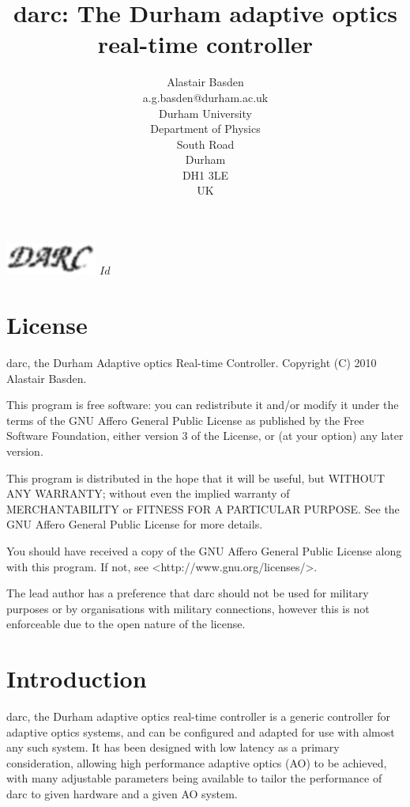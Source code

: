 \documentclass[a4,10pt]{article}
\title{darc: The Durham adaptive optics real-time controller}
\author{Alastair Basden \\ a.g.basden@durham.ac.uk \\ Durham University \\ Department of Physics
  \\ South Road \\ Durham \\ DH1 3LE \\ UK}
\providecommand{\gitID}{$Id$}
\newcommand{\ao}{adaptive optics (AO)\renewcommand{\ao}{AO\xspace}\xspace}
\begin{document}
\maketitle
{\hspace{7cm} \includegraphics[width=3cm]{darclogo.eps}}
\vfill
\gitID
%

\pagebreak
\tableofcontents
\pagebreak
\section{License}
darc, the Durham Adaptive optics Real-time Controller.
Copyright (C) 2010 Alastair Basden.

This program is free software: you can redistribute it and/or modify
it under the terms of the GNU Affero General Public License as
published by the Free Software Foundation, either version 3 of the
License, or (at your option) any later version.

This program is distributed in the hope that it will be useful,
but WITHOUT ANY WARRANTY; without even the implied warranty of
MERCHANTABILITY or FITNESS FOR A PARTICULAR PURPOSE.  See the
GNU Affero General Public License for more details.

You should have received a copy of the GNU Affero General Public License
along with this program.  If not, see <http://www.gnu.org/licenses/>.

The lead author has a preference that darc should not be used for
military purposes or by organisations with military connections,
however this is not enforceable due to the open nature of the license.

\section{Introduction}
darc, the Durham adaptive optics real-time controller is a generic
controller for adaptive optics systems, and can be configured and
adapted for use with almost any such system.  It has been designed
with low latency as a primary consideration, allowing high performance
\ao to be achieved, with many adjustable parameters being available to
tailor the performance of darc to given hardware and a given \ao
system.
\end{document}

